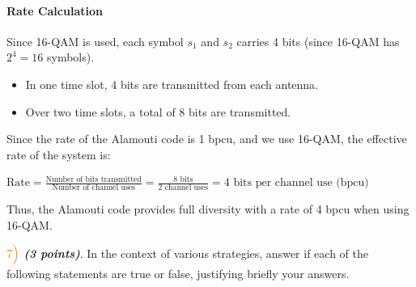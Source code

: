 \documentclass[11pt]{article}
\providecommand{\tightlist}{%
      \setlength{\itemsep}{0pt}\setlength{\parskip}{0pt}}
\begin{document}
\paragraph{Rate Calculation}\label{rate-calculation}

Since 16-QAM is used, each symbol \(s_1\) and \(s_2\) carries 4 bits
(since 16-QAM has \(2^4 = 16\) symbols).

\begin{itemize}
\tightlist
\item
  In one time slot, 4 bits are transmitted from each antenna.
\item
  Over two time slots, a total of 8 bits are transmitted.
\end{itemize}

Since the rate of the Alamouti code is 1 bpcu, and we use 16-QAM, the
effective rate of the system is:

\(\text{Rate} = \frac{\text{Number of bits transmitted}}{\text{Number of channel uses}} = \frac{8 \text{ bits}}{2 \text{ channel uses}} = 4 \text{ bits per channel use (bpcu)}\)

Thus, the Alamouti code provides full diversity with a rate of 4 bpcu
when using 16-QAM.

    \(\color{orange}7\Bigl)\) \textbf{\emph{(3 points)}}. In the context of
various strategies, answer if each of the following statements are true
or false, justifying briefly your answers.
\end{document}
